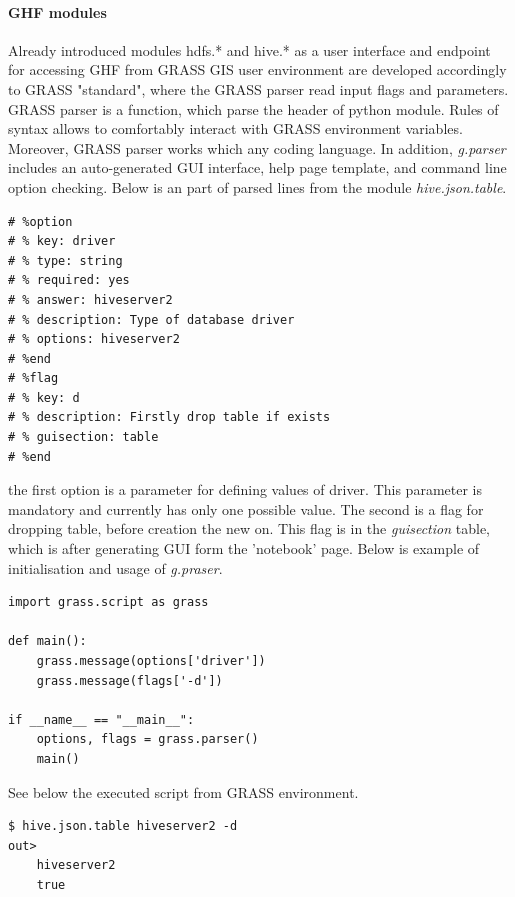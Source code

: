\documentclass[a4paper,12pt,oneside]{report}
\begin{document}
\paragraph{GHF modules}
Already introduced modules hdfs.* and hive.* as a user interface and endpoint for accessing GHF from GRASS GIS user environment  are developed accordingly to GRASS "standard", where the GRASS parser read input flags and parameters. GRASS parser is a function, which parse the header of python module.  Rules of syntax allows to comfortably interact with GRASS environment variables. Moreover, GRASS parser works which any coding language. In addition, \textit{g.parser} includes an auto-generated GUI interface, help page template, and command line option checking. 
Below is an part of parsed lines from the module \textit{hive.json.table}.
\begin{footnotesize}
\begin{lstlisting}[style=python]
# %option
# % key: driver
# % type: string
# % required: yes
# % answer: hiveserver2
# % description: Type of database driver
# % options: hiveserver2
# %end
# %flag
# % key: d
# % description: Firstly drop table if exists
# % guisection: table
# %end
\end{lstlisting}
\end{footnotesize}
the first option is a parameter for defining values of driver. This parameter is mandatory and currently has only one possible value. The second is a flag for dropping table, before creation the new on. This flag is in the \textit{guisection} table, which is after generating GUI form the 'notebook' page. Below is example of initialisation and usage of \textit{g.praser}.
\begin{footnotesize}
\begin{lstlisting}[style=python]
import grass.script as grass

def main():
	grass.message(options['driver'])
	grass.message(flags['-d'])
	
if __name__ == "__main__":
    options, flags = grass.parser()
    main()

\end{lstlisting}
\end{footnotesize}
See below the executed script from GRASS environment.
\begin{footnotesize}
\begin{lstlisting}[style=python]
$ hive.json.table hiveserver2 -d
out> 
	hiveserver2
	true
\end{lstlisting}
\end{footnotesize}
\end{document}
